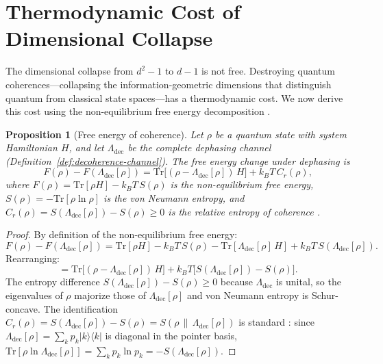 \documentclass[12pt,a4paper]{article}
\newtheorem{proposition}[theorem]{Proposition}
\theoremstyle{definition}
\theoremstyle{remark}
\begin{document}
\section{Thermodynamic Cost of Dimensional Collapse}
\label{sec:thermodynamics}
The dimensional collapse from $d^2 - 1$ to $d - 1$ is not free.  Destroying quantum coherences---collapsing the information-geometric dimensions that distinguish quantum from classical state spaces---has a thermodynamic cost.  We now derive this cost using the non-equilibrium free energy decomposition \cite{lostaglio2015description,korzekwa2016extraction}.

\begin{proposition}[Free energy of coherence]
\label{prop:free-energy-coherence}
Let $\rho$ be a quantum state with system Hamiltonian $H$, and let $\Lambda_{\mathrm{dec}}$ be the complete dephasing channel \emph{(Definition~\ref{def:decoherence-channel})}.  The free energy change under dephasing is
\begin{equation}
\label{eq:free-energy-general}
F(\rho) - F(\Lambda_{\mathrm{dec}}[\rho]) = \mathrm{Tr}\bigl[(\rho - \Lambda_{\mathrm{dec}}[\rho])\, H\bigr] + k_B T\, C_r(\rho),
\end{equation}
where $F(\rho) = \mathrm{Tr}[\rho H] - k_B T\, S(\rho)$ is the non-equilibrium free energy, $S(\rho) = -\mathrm{Tr}[\rho \ln \rho]$ is the von Neumann entropy, and $C_r(\rho) = S(\Lambda_{\mathrm{dec}}[\rho]) - S(\rho) \geq 0$ is the relative entropy of coherence \cite{streltsov2017colloquium}.
\end{proposition}

\begin{proof}
By definition of the non-equilibrium free energy:
\[
F(\rho) - F(\Lambda_{\mathrm{dec}}[\rho]) = \mathrm{Tr}[\rho H] - k_B T\, S(\rho) - \mathrm{Tr}[\Lambda_{\mathrm{dec}}[\rho]\, H] + k_B T\, S(\Lambda_{\mathrm{dec}}[\rho]).
\]
Rearranging:
\[
= \mathrm{Tr}\bigl[(\rho - \Lambda_{\mathrm{dec}}[\rho])\, H\bigr] + k_B T \bigl[S(\Lambda_{\mathrm{dec}}[\rho]) - S(\rho)\bigr].
\]
The entropy difference $S(\Lambda_{\mathrm{dec}}[\rho]) - S(\rho) \geq 0$ because $\Lambda_{\mathrm{dec}}$ is unital, so the eigenvalues of $\rho$ majorize those of $\Lambda_{\mathrm{dec}}[\rho]$ and von Neumann entropy is Schur-concave.  The identification $C_r(\rho) = S(\Lambda_{\mathrm{dec}}[\rho]) - S(\rho) = S(\rho \,\|\, \Lambda_{\mathrm{dec}}[\rho])$ is standard \cite{streltsov2017colloquium}: since $\Lambda_{\mathrm{dec}}[\rho] = \sum_k p_k |k\rangle\langle k|$ is diagonal in the pointer basis, $\mathrm{Tr}[\rho \ln \Lambda_{\mathrm{dec}}[\rho]] = \sum_k p_k \ln p_k = -S(\Lambda_{\mathrm{dec}}[\rho])$.
\end{proof}
\end{document}
